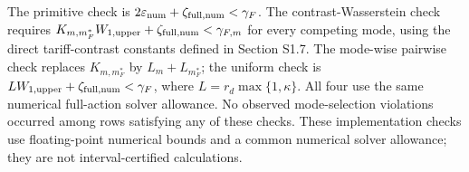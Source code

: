 \begingroup
\small
\setlength{\tabcolsep}{5pt}
\renewcommand{\arraystretch}{1.15}
\begin{table}[tbp]
\centering
\caption{Numerical sufficient-condition implementation checks.}
\label{tab:numerical-sufficient-condition-audit}
\par\smallskip
\begin{minipage}{\linewidth}\footnotesize The primitive check is $2\varepsilon_{\rm num}+\zeta_{\rm full,num}<\gamma_F$. The contrast-Wasserstein check requires $K_{m,m_F^*}W_{1,\rm upper}+\zeta_{\rm full,num}<\gamma_{F,m}$ for every competing mode, using the direct tariff-contrast constants defined in Section S1.7. The mode-wise pairwise check replaces $K_{m,m_F^*}$ by $L_m+L_{m_F^*}$; the uniform check is $LW_{1,\rm upper}+\zeta_{\rm full,num}<\gamma_F$, where $L=r_d\max\{1,\kappa\}$. All four use the same numerical full-action solver allowance. No observed mode-selection violations occurred among rows satisfying any of these checks. These implementation checks use floating-point numerical bounds and a common numerical solver allowance; they are not interval-certified calculations.\end{minipage}
\end{table}
\endgroup
